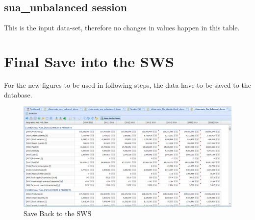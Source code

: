 \documentclass[]{article}
\begin{document}
\subsection{sua\_unbalanced session}\label{sua_unbalanced-session}

This is the input data-set, therefore no changes in values happen in
this table.

\section{Final Save into the SWS}\label{final-save-into-the-sws}

For the new figures to be used in following steps, the data have to be
saved to the database.

\begin{figure}[H]

{\centering \includegraphics[width=1\linewidth]{images/standPlugin/36_saveBack} 

}

\caption{\label{fig:f38}Save Back to the SWS}\label{fig:f38}
\end{figure}
\end{document}
